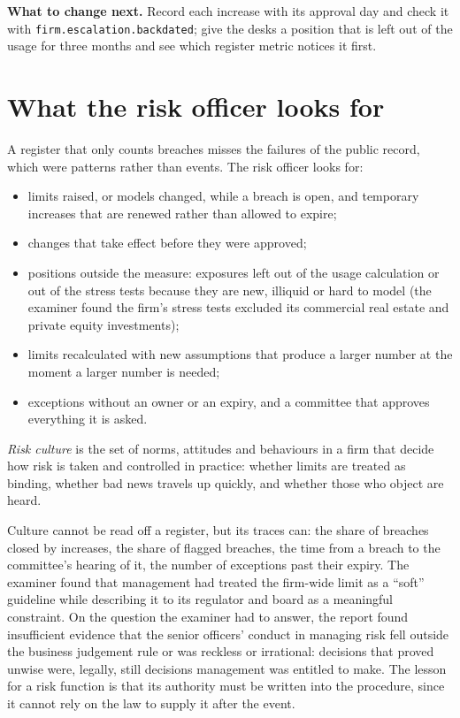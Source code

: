 \textbf{What to change next.} Record each increase with its approval day and check it with \texttt{firm.escalation.backdated}; give the desks a
position that is left out of the usage for three months and see which register metric notices it first.

\section{What the risk officer looks for}

A register that only counts breaches misses the failures of the public record, which were patterns rather than events. The risk officer looks for:
\begin{itemize}
\item limits raised, or models changed, while a breach is open, and temporary increases that are renewed rather than allowed to expire;
\item changes that take effect before they were approved;
\item positions outside the measure: exposures left out of the usage calculation or out of the stress tests because they are new, illiquid or
hard to model (the examiner found the firm's stress tests excluded its commercial real estate and private equity investments);
\item limits recalculated with new assumptions that produce a larger number at the moment a larger number is needed;
\item exceptions without an owner or an expiry, and a committee that approves everything it is asked.
\end{itemize}

\begin{definition}\label{def:fm:the-risk-management-function:culture}
\emph{Risk culture} is the set of norms, attitudes and behaviours in a firm that decide how risk is taken and controlled in
practice: whether limits are treated as binding, whether bad news travels up quickly, and whether those who object are heard.
\end{definition}

Culture cannot be read off a register, but its traces can: the share of breaches closed by increases, the share of flagged breaches, the time
from a breach to the committee's hearing of it, the number of exceptions past their expiry. The examiner found that management had treated the
firm-wide limit as a ``soft'' guideline while describing it to its regulator and board as a meaningful constraint. On the question the examiner
had to answer, the report found insufficient evidence that the senior officers' conduct in managing risk fell outside the business judgement rule or
was reckless or irrational: decisions that proved unwise were, legally, still decisions management was entitled to make. The lesson for a risk
function is that its authority must be written into the procedure, since it cannot rely on the law to supply it after the event.

